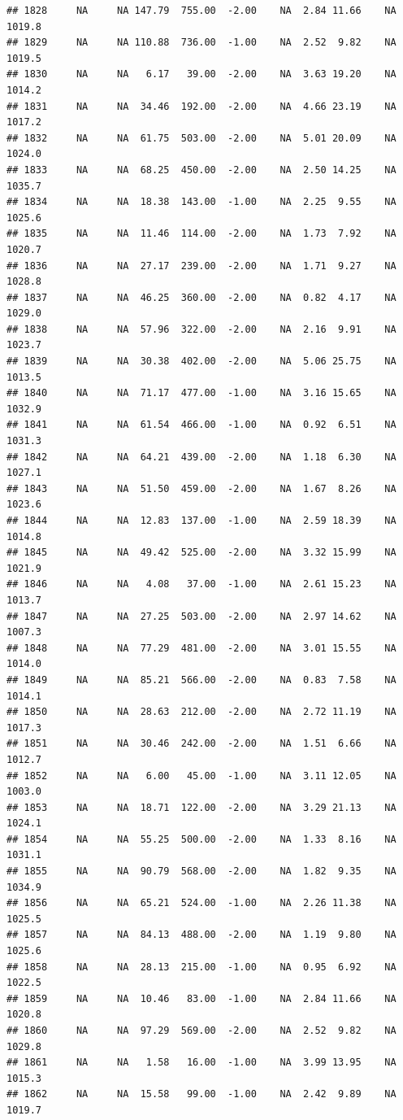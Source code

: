 \documentclass{article}\usepackage{graphicx, color}
\makeatletter
\newenvironment{kframe}{%
 \def\at@end@of@kframe{}%
 \ifinner\ifhmode%
  \def\at@end@of@kframe{\end{minipage}}%
  \begin{minipage}{\columnwidth}%
 \fi\fi%
 \def\FrameCommand##1{\hskip\@totalleftmargin \hskip-\fboxsep
 \colorbox{shadecolor}{##1}\hskip-\fboxsep
     \hskip-\linewidth \hskip-\@totalleftmargin \hskip\columnwidth}%
 \MakeFramed {\advance\hsize-\width
   \@totalleftmargin\z@ \linewidth\hsize
   \@setminipage}}%
 {\par\unskip\endMakeFramed%
 \at@end@of@kframe}
\newenvironment{knitrout}{}{} %
\makeatother
\begin{document}
\begin{knitrout}
\begin{kframe}
\begin{verbatim}
## 1828     NA     NA 147.79  755.00  -2.00    NA  2.84 11.66    NA 1019.8
## 1829     NA     NA 110.88  736.00  -1.00    NA  2.52  9.82    NA 1019.5
## 1830     NA     NA   6.17   39.00  -2.00    NA  3.63 19.20    NA 1014.2
## 1831     NA     NA  34.46  192.00  -2.00    NA  4.66 23.19    NA 1017.2
## 1832     NA     NA  61.75  503.00  -2.00    NA  5.01 20.09    NA 1024.0
## 1833     NA     NA  68.25  450.00  -2.00    NA  2.50 14.25    NA 1035.7
## 1834     NA     NA  18.38  143.00  -1.00    NA  2.25  9.55    NA 1025.6
## 1835     NA     NA  11.46  114.00  -2.00    NA  1.73  7.92    NA 1020.7
## 1836     NA     NA  27.17  239.00  -2.00    NA  1.71  9.27    NA 1028.8
## 1837     NA     NA  46.25  360.00  -2.00    NA  0.82  4.17    NA 1029.0
## 1838     NA     NA  57.96  322.00  -2.00    NA  2.16  9.91    NA 1023.7
## 1839     NA     NA  30.38  402.00  -2.00    NA  5.06 25.75    NA 1013.5
## 1840     NA     NA  71.17  477.00  -1.00    NA  3.16 15.65    NA 1032.9
## 1841     NA     NA  61.54  466.00  -1.00    NA  0.92  6.51    NA 1031.3
## 1842     NA     NA  64.21  439.00  -2.00    NA  1.18  6.30    NA 1027.1
## 1843     NA     NA  51.50  459.00  -2.00    NA  1.67  8.26    NA 1023.6
## 1844     NA     NA  12.83  137.00  -1.00    NA  2.59 18.39    NA 1014.8
## 1845     NA     NA  49.42  525.00  -2.00    NA  3.32 15.99    NA 1021.9
## 1846     NA     NA   4.08   37.00  -1.00    NA  2.61 15.23    NA 1013.7
## 1847     NA     NA  27.25  503.00  -2.00    NA  2.97 14.62    NA 1007.3
## 1848     NA     NA  77.29  481.00  -2.00    NA  3.01 15.55    NA 1014.0
## 1849     NA     NA  85.21  566.00  -2.00    NA  0.83  7.58    NA 1014.1
## 1850     NA     NA  28.63  212.00  -2.00    NA  2.72 11.19    NA 1017.3
## 1851     NA     NA  30.46  242.00  -2.00    NA  1.51  6.66    NA 1012.7
## 1852     NA     NA   6.00   45.00  -1.00    NA  3.11 12.05    NA 1003.0
## 1853     NA     NA  18.71  122.00  -2.00    NA  3.29 21.13    NA 1024.1
## 1854     NA     NA  55.25  500.00  -2.00    NA  1.33  8.16    NA 1031.1
## 1855     NA     NA  90.79  568.00  -2.00    NA  1.82  9.35    NA 1034.9
## 1856     NA     NA  65.21  524.00  -1.00    NA  2.26 11.38    NA 1025.5
## 1857     NA     NA  84.13  488.00  -2.00    NA  1.19  9.80    NA 1025.6
## 1858     NA     NA  28.13  215.00  -1.00    NA  0.95  6.92    NA 1022.5
## 1859     NA     NA  10.46   83.00  -1.00    NA  2.84 11.66    NA 1020.8
## 1860     NA     NA  97.29  569.00  -2.00    NA  2.52  9.82    NA 1029.8
## 1861     NA     NA   1.58   16.00  -1.00    NA  3.99 13.95    NA 1015.3
## 1862     NA     NA  15.58   99.00  -1.00    NA  2.42  9.89    NA 1019.7

\end{verbatim}
\end{kframe}
\end{knitrout}
\end{document}
